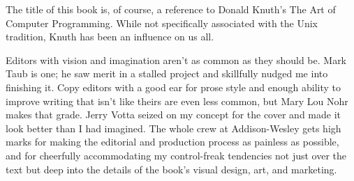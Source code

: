 \documentclass[12pt,oneside]{book}
\begin{document}
\begin{common-format}
The title of this book is, of course, a reference to Donald Knuth's The Art of Computer Programming. While not specifically associated with the Unix tradition, Knuth has been an influence on us all.

Editors with vision and imagination aren't as common as they should be. Mark Taub is one; he saw merit in a stalled project and skillfully nudged me into finishing it. Copy editors with a good ear for prose style and enough ability to improve writing that isn't like theirs are even less common, but Mary Lou Nohr makes that grade. Jerry Votta seized on my concept for the cover and made it look better than I had imagined. The whole crew at Addison-Wesley gets high marks for making the editorial and production process as painless as possible, and for cheerfully accommodating my control-freak tendencies not just over the text but deep into the details of the book's visual design, art, and marketing.


\end{common-format}


\setcounter{tocdepth}{2}    
\tableofcontents
\end{document}
